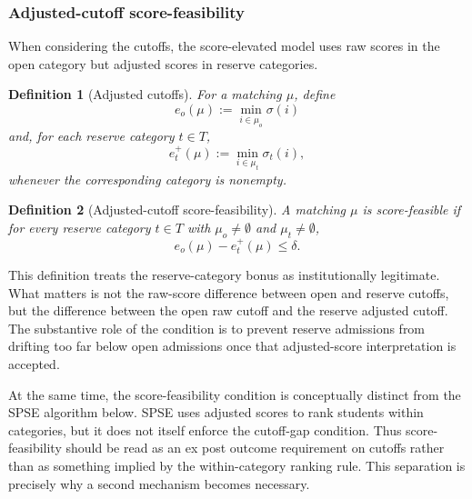 \documentclass[12pt]{article}
\newtheorem{definition}{Definition}
\newcommand{\1}{\mathbf{1}}
\begin{document}


\subsubsection{Adjusted-cutoff score-feasibility}



When considering the cutoffs, the score-elevated model uses raw scores in the open category but adjusted scores in reserve categories.

\begin{definition}[Adjusted cutoffs]
For a matching $\mu$, define
\[
e_o(\mu):=\min_{i\in\mu_o}\sigma(i)
\]
and, for each reserve category $t\in T$,
\[
e_t^+(\mu):=\min_{i\in\mu_t}\sigma_t(i),
\]
whenever the corresponding category is nonempty.
\end{definition}

\begin{definition}[Adjusted-cutoff score-feasibility]
A matching $\mu$ is score-feasible if for every reserve category $t\in T$ with $\mu_o\neq\emptyset$ and $\mu_t\neq\emptyset$,
\[
e_o(\mu)-e_t^+(\mu)\le \delta.
\]
\end{definition}

This definition treats the reserve-category bonus as institutionally legitimate. What matters is not the raw-score difference between open and reserve cutoffs, but the difference between the open raw cutoff and the reserve adjusted cutoff. The substantive role of the condition is to prevent reserve admissions from drifting too far below open admissions once that adjusted-score interpretation is accepted.

At the same time, the score-feasibility condition is conceptually distinct from the SPSE algorithm below. SPSE uses adjusted scores to rank students within categories, but it does not itself enforce the cutoff-gap condition. Thus score-feasibility should be read as an ex post outcome requirement on cutoffs rather than as something implied by the within-category ranking rule. This separation is precisely why a second mechanism becomes necessary.
\end{document}
